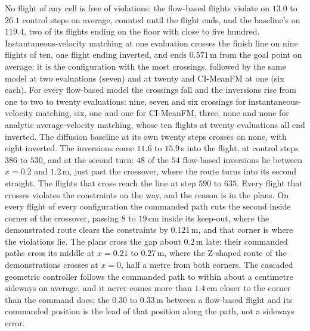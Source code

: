 No flight of any cell is free of violations: the flow-based flights violate on $13.0$ to $26.1$ control
steps on average, counted until the flight ends, and the baseline's on $119.4$, two of its flights ending on
the floor with close to five hundred. Instantaneous-velocity matching at one evaluation
crosses the finish line on nine flights of ten, one flight ending inverted, and ends $0.571$\,m from the
goal point on average; it is the configuration with the most crossings, followed by the same model at two
evaluations (seven) and at twenty and CI-MeanFM at one (six each). For every flow-based model the crossings
fall and the inversions rise from one to two to twenty evaluations: nine, seven and six crossings for
instantaneous-velocity matching, six, one and one for CI-MeanFM, three, none and none for analytic
average-velocity matching, whose ten flights at twenty evaluations all end inverted. The diffusion baseline
at its own twenty steps crosses on none, with eight inverted. The inversions come $11.6$ to $15.9$\,s into the
flight, at control steps $386$ to $530$, and at the second turn: $48$ of the $54$ flow-based inversions lie
between $x=0.2$ and $1.2$\,m, just past the crossover, where the route turns into its second straight. The
flights that cross reach the line at step $590$ to $635$. Every flight that crosses violates the constraints
on the way, and the reason is in the plans. On every flight of every configuration the commanded path cuts
the second inside corner of the crossover, passing $8$ to $19$\,cm inside its keep-out, where the
demonstrated route clears the constraints by $0.121$\,m, and that corner is where the violations lie. The plans
cross the gap about $0.2$\,m late: their commanded paths cross its middle at $x=0.21$ to $0.27$\,m, where the
Z-shaped route of the demonstrations crosses at $x=0$, half a metre from both corners. The
cascaded geometric controller follows the commanded path to within about a centimetre sideways on average,
and it never comes more than $1.4$\,cm closer to the corner than the command does; the $0.30$ to $0.33$\,m
between a flow-based flight and its commanded position is the lead of that position along the path, not a
sideways error.

